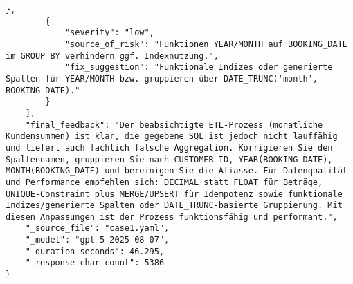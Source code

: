 \begin{lstlisting}[caption={Ausgabe: GPT-5 Anwendungsfall 1 Robustheitsdurchlauf},label={gpt_case1_prompt3}]
        },
        {
            "severity": "low",
            "source_of_risk": "Funktionen YEAR/MONTH auf BOOKING_DATE im GROUP BY verhindern ggf. Indexnutzung.",
            "fix_suggestion": "Funktionale Indizes oder generierte Spalten für YEAR/MONTH bzw. gruppieren über DATE_TRUNC('month', BOOKING_DATE)."
        }
    ],
    "final_feedback": "Der beabsichtigte ETL-Prozess (monatliche Kundensummen) ist klar, die gegebene SQL ist jedoch nicht lauffähig und liefert auch fachlich falsche Aggregation. Korrigieren Sie den Spaltennamen, gruppieren Sie nach CUSTOMER_ID, YEAR(BOOKING_DATE), MONTH(BOOKING_DATE) und bereinigen Sie die Aliasse. Für Datenqualität und Performance empfehlen sich: DECIMAL statt FLOAT für Beträge, UNIQUE-Constraint plus MERGE/UPSERT für Idempotenz sowie funktionale Indizes/generierte Spalten oder DATE_TRUNC-basierte Gruppierung. Mit diesen Anpassungen ist der Prozess funktionsfähig und performant.",
    "_source_file": "case1.yaml",
    "_model": "gpt-5-2025-08-07",
    "_duration_seconds": 46.295,
    "_response_char_count": 5386
}
\end{lstlisting}

